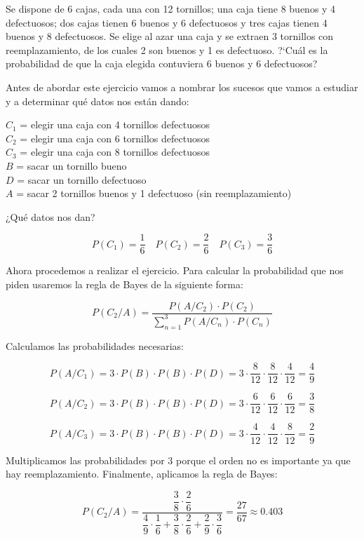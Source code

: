 \problem

Se dispone de  6 cajas,  cada una con 12 tornillos; una caja tiene 8 buenos y 4 defectuosos; dos cajas tienen  6  buenos  y 6 defectuosos y tres cajas tienen 4 buenos y 8 defectuosos. Se  elige  al azar una caja y se extraen 3  tornillos con reemplazamiento, de los cuales 2 son buenos y 1 es defectuoso. ?`Cu{\'a}l es la probabilidad de  que
la caja elegida contuviera 6 buenos y 6 defectuosos?

Antes de abordar este ejercicio vamos a nombrar los sucesos que vamos a estudiar y a determinar qué datos nos están dando:

$C_1$ = elegir una caja con 4 tornillos defectuosos\\
$C_2$ = elegir una caja con 6 tornillos defectuosos\\
$C_3$ = elegir una caja con 8 tornillos defectuosos\\
$B$ = sacar un tornillo bueno\\
$D$ = sacar un tornillo defectuoso\\
$A$ = sacar 2 tornillos buenos y 1 defectuoso (sin reemplazamiento)

¿Qué datos nos dan?

\begin{equation*}
    P(C_1) = \dfrac{1}{6}
    \quad
    P(C_2) = \dfrac{2}{6}
    \quad
    P(C_3) = \dfrac{3}{6}
\end{equation*}

Ahora procedemos a realizar el ejercicio. Para calcular la probabilidad que nos piden usaremos la regla de Bayes de la siguiente forma:

\begin{equation*}
    P(C_2/A) = \dfrac{P(A/C_2) \cdot P(C_2)}{\sum_{n=1}^3 P(A/C_n) \cdot P(C_n)}
\end{equation*}

Calculamos las probabilidades necesarias:

\begin{equation*}
    P(A/C_1) = 3 \cdot P(B) \cdot P(B) \cdot P(D) = 3 \cdot \dfrac{8}{12} \cdot \dfrac{8}{12} \cdot \dfrac{4}{12} = \dfrac{4}{9}
\end{equation*}
    
\begin{equation*}
    P(A/C_2) = 3 \cdot P(B) \cdot P(B) \cdot P(D) = 3 \cdot \dfrac{6}{12} \cdot \dfrac{6}{12} \cdot \dfrac{6}{12} = \dfrac{3}{8}
\end{equation*}

\begin{equation*}
    P(A/C_3) = 3 \cdot P(B) \cdot P(B) \cdot P(D) = 3 \cdot \dfrac{4}{12} \cdot \dfrac{4}{12} \cdot \dfrac{8}{12} = \dfrac{2}{9}
\end{equation*}

Multiplicamos las probabilidades por $3$ porque el orden no es importante ya que hay reemplazamiento. Finalmente, aplicamos la regla de Bayes:

\begin{equation*}
    P(C_2/A) = \dfrac{\dfrac{3}{8} \cdot \dfrac{2}{6}}{\dfrac{4}{9} \cdot \dfrac{1}{6} + \dfrac{3}{8} \cdot \dfrac{2}{6} + \dfrac{2}{9} \cdot \dfrac{3}{6}} = \dfrac{27}{67} \approx 0.403
\end{equation*}
